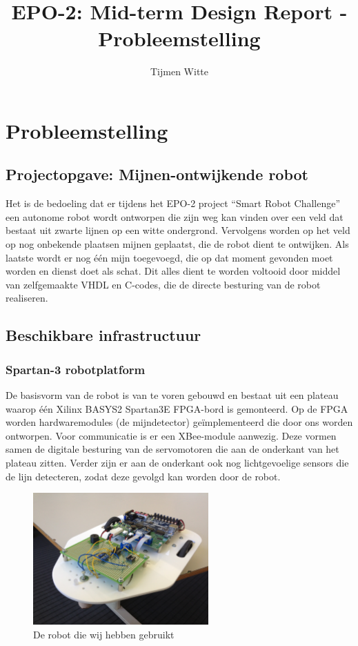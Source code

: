 \documentclass{report}
\title{EPO-2: Mid-term Design Report - Probleemstelling}
\author{Tijmen Witte}
\begin{document}
\chapter{Probleemstelling}
\label{ch:probleemstelling}

\section{Projectopgave: Mijnen-ontwijkende robot}

Het is de bedoeling dat er tijdens het EPO-2 project ``Smart Robot Challenge'' een autonome robot wordt ontworpen die zijn weg kan vinden over een veld dat bestaat uit zwarte lijnen op een witte ondergrond.
Vervolgens worden op het veld op nog onbekende plaatsen mijnen geplaatst, die de robot dient te ontwijken.
Als laatste wordt er nog één mijn toegevoegd, die op dat moment gevonden moet worden en dienst doet als schat.
Dit alles dient te worden voltooid door middel van zelfgemaakte VHDL en C-codes, die de directe besturing van de robot realiseren.


\section{Beschikbare infrastructuur}
\subsection{Spartan-3 robotplatform}

De basisvorm van de robot is van te voren gebouwd en bestaat uit een plateau waarop één Xilinx BASYS2 Spartan3E FPGA-bord is gemonteerd.
Op de FPGA worden hardwaremodules (de mijndetector) geïmplementeerd die door ons worden ontworpen.
Voor communicatie is er een XBee-module aanwezig.
Deze vormen samen de digitale besturing van de servomotoren die aan de onderkant van het plateau zitten.
Verder zijn er aan de onderkant ook nog lichtgevoelige sensors die de lijn detecteren, zodat deze gevolgd kan worden door de robot.

\begin{figure}[H]
	\centering
	\includegraphics[width=0.6\textwidth]{robot.jpg}
	\caption{De robot die wij hebben gebruikt}
	\label{fig:robot}
\end{figure}
\end{document}
